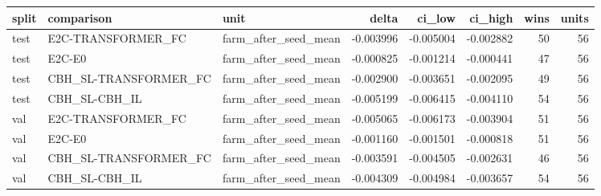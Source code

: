 \begin{tabular}{lllrrrrr}
\toprule
split & comparison & unit & delta & ci\_low & ci\_high & wins & units \\
\midrule
test & E2C-TRANSFORMER\_FC & farm\_after\_seed\_mean & -0.003996 & -0.005004 & -0.002882 & 50 & 56 \\
test & E2C-E0 & farm\_after\_seed\_mean & -0.000825 & -0.001214 & -0.000441 & 47 & 56 \\
test & CBH\_SL-TRANSFORMER\_FC & farm\_after\_seed\_mean & -0.002900 & -0.003651 & -0.002095 & 49 & 56 \\
test & CBH\_SL-CBH\_IL & farm\_after\_seed\_mean & -0.005199 & -0.006415 & -0.004110 & 54 & 56 \\
val & E2C-TRANSFORMER\_FC & farm\_after\_seed\_mean & -0.005065 & -0.006173 & -0.003904 & 51 & 56 \\
val & E2C-E0 & farm\_after\_seed\_mean & -0.001160 & -0.001501 & -0.000818 & 51 & 56 \\
val & CBH\_SL-TRANSFORMER\_FC & farm\_after\_seed\_mean & -0.003591 & -0.004505 & -0.002631 & 46 & 56 \\
val & CBH\_SL-CBH\_IL & farm\_after\_seed\_mean & -0.004309 & -0.004984 & -0.003657 & 54 & 56 \\
\bottomrule
\end{tabular}
